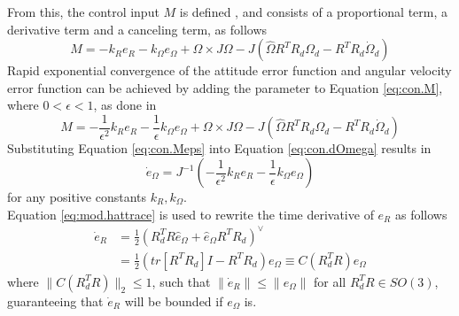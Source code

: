 From this, the control input $ M $ is defined \cite{Lee2010c}, and consists of a proportional term, a derivative term and a canceling term, as follows
\begin{equation}\label{eq:con.M}
M = -k_Re_R-k_\Omega e_\Omega+\Omega\times J\Omega-J(\hat{\Omega}R^TR_d\Omega_d-R^TR_d\dot{\Omega}_d)
\end{equation}
Rapid exponential convergence of the attitude error function and angular velocity error function can be achieved by adding
the parameter  to
Equation \ref{eq:con.M}, where $ 0<\epsilon<1 $, as done in \cite{Sreenath2013c}
\begin{equation}\label{eq:con.Meps}
M = -\frac{1}{\epsilon^2}k_Re_R-\frac{1}{\epsilon}k_\Omega e_\Omega+\Omega\times J\Omega-J(\hat{\Omega}R^TR_d\Omega_d-R^TR_d\dot{\Omega}_d)
\end{equation}
Substituting Equation \ref{eq:con.Meps} into Equation \ref{eq:con.dOmega} results in
\begin{equation}\label{eq:con.JdeOmega}
\dot{e}_\Omega=J^{-1}(-\frac{1}{\epsilon^2}k_Re_R-\frac{1}{\epsilon}k_\Omega e_\Omega)
\end{equation} 
for any positive constants $ k_R, k_\Omega $.\\
Equation \ref{eq:mod.hattrace} is used to rewrite the time derivative of $ e_R $ as follows
 \begin{equation}\label{eq:con.deR}
 \begin{aligned}
 \dot{e}_R&=\frac{1}{2}(R_d^TR\hat{e}_\Omega+\hat{e}_\Omega R^TR_d)^\vee\\
 &=\frac{1}{2}(tr[R^TR_d]I-R^TR_d)e_\Omega \equiv C(R_d^TR)e_\Omega 
 \end{aligned}
 \end{equation}
where $ \parallel C(R_d^TR)\parallel_2\leq 1 $, such that $ \parallel\dot{e}_R\parallel\leq\parallel e_\Omega \parallel  $ for all $ R^T_dR\in SO(3) $, guaranteeing that $ \dot{e}_R $ will be bounded if $ e_\Omega $ is. 

